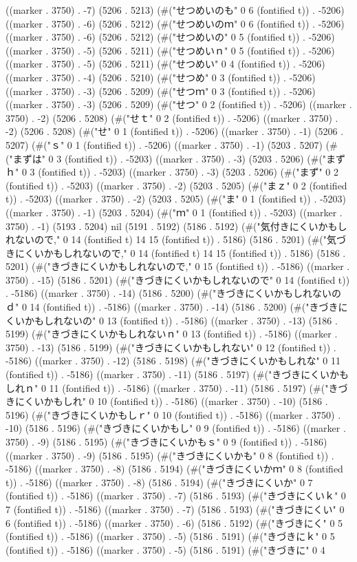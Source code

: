 {{((marker . 3750) . -7) (5206 . 5213) (#("せつめいのも" 0 6 (fontified t)) . -5206) ((marker . 3750) . -6) (5206 . 5212) (#("せつめいのｍ" 0 6 (fontified t)) . -5206) ((marker . 3750) . -6) (5206 . 5212) (#("せつめいの" 0 5 (fontified t)) . -5206) ((marker . 3750) . -5) (5206 . 5211) (#("せつめいｎ" 0 5 (fontified t)) . -5206) ((marker . 3750) . -5) (5206 . 5211) (#("せつめい" 0 4 (fontified t)) . -5206) ((marker . 3750) . -4) (5206 . 5210) (#("せつめ" 0 3 (fontified t)) . -5206) ((marker . 3750) . -3) (5206 . 5209) (#("せつｍ" 0 3 (fontified t)) . -5206) ((marker . 3750) . -3) (5206 . 5209) (#("せつ" 0 2 (fontified t)) . -5206) ((marker . 3750) . -2) (5206 . 5208) (#("せｔ" 0 2 (fontified t)) . -5206) ((marker . 3750) . -2) (5206 . 5208) (#("せ" 0 1 (fontified t)) . -5206) ((marker . 3750) . -1) (5206 . 5207) (#("ｓ" 0 1 (fontified t)) . -5206) ((marker . 3750) . -1) (5203 . 5207) (#("まずは" 0 3 (fontified t)) . -5203) ((marker . 3750) . -3) (5203 . 5206) (#("まずｈ" 0 3 (fontified t)) . -5203) ((marker . 3750) . -3) (5203 . 5206) (#("まず" 0 2 (fontified t)) . -5203) ((marker . 3750) . -2) (5203 . 5205) (#("まｚ" 0 2 (fontified t)) . -5203) ((marker . 3750) . -2) (5203 . 5205) (#("ま" 0 1 (fontified t)) . -5203) ((marker . 3750) . -1) (5203 . 5204) (#("ｍ" 0 1 (fontified t)) . -5203) ((marker . 3750) . -1) (5193 . 5204) nil (5191 . 5192) (5186 . 5192) (#("気付きにくいかもしれないので," 0 14 (fontified t) 14 15 (fontified t)) . 5186) (5186 . 5201) (#("気づきにくいかもしれないので," 0 14 (fontified t) 14 15 (fontified t)) . 5186) (5186 . 5201) (#("きづきにくいかもしれないので," 0 15 (fontified t)) . -5186) ((marker . 3750) . -15) (5186 . 5201) (#("きづきにくいかもしれないので" 0 14 (fontified t)) . -5186) ((marker . 3750) . -14) (5186 . 5200) (#("きづきにくいかもしれないのｄ" 0 14 (fontified t)) . -5186) ((marker . 3750) . -14) (5186 . 5200) (#("きづきにくいかもしれないの" 0 13 (fontified t)) . -5186) ((marker . 3750) . -13) (5186 . 5199) (#("きづきにくいかもしれないｎ" 0 13 (fontified t)) . -5186) ((marker . 3750) . -13) (5186 . 5199) (#("きづきにくいかもしれない" 0 12 (fontified t)) . -5186) ((marker . 3750) . -12) (5186 . 5198) (#("きづきにくいかもしれな" 0 11 (fontified t)) . -5186) ((marker . 3750) . -11) (5186 . 5197) (#("きづきにくいかもしれｎ" 0 11 (fontified t)) . -5186) ((marker . 3750) . -11) (5186 . 5197) (#("きづきにくいかもしれ" 0 10 (fontified t)) . -5186) ((marker . 3750) . -10) (5186 . 5196) (#("きづきにくいかもしｒ" 0 10 (fontified t)) . -5186) ((marker . 3750) . -10) (5186 . 5196) (#("きづきにくいかもし" 0 9 (fontified t)) . -5186) ((marker . 3750) . -9) (5186 . 5195) (#("きづきにくいかもｓ" 0 9 (fontified t)) . -5186) ((marker . 3750) . -9) (5186 . 5195) (#("きづきにくいかも" 0 8 (fontified t)) . -5186) ((marker . 3750) . -8) (5186 . 5194) (#("きづきにくいかｍ" 0 8 (fontified t)) . -5186) ((marker . 3750) . -8) (5186 . 5194) (#("きづきにくいか" 0 7 (fontified t)) . -5186) ((marker . 3750) . -7) (5186 . 5193) (#("きづきにくいｋ" 0 7 (fontified t)) . -5186) ((marker . 3750) . -7) (5186 . 5193) (#("きづきにくい" 0 6 (fontified t)) . -5186) ((marker . 3750) . -6) (5186 . 5192) (#("きづきにく" 0 5 (fontified t)) . -5186) ((marker . 3750) . -5) (5186 . 5191) (#("きづきにｋ" 0 5 (fontified t)) . -5186) ((marker . 3750) . -5) (5186 . 5191) (#("きづきに" 0 4 }}

